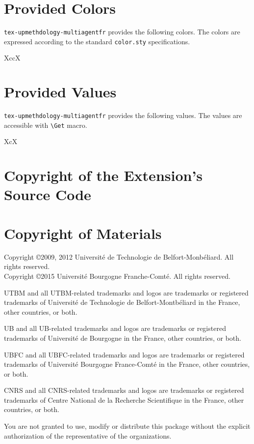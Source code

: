 \documentclass[article]{upmethodology-document}
\gdef\upmextensiondoccolorlist{}
\gdef\upmextensiondocvaluelist{}
\begin{document}
\section{Provided Colors}

\texttt{tex-upmethdology-multiagentfr} provides the following colors. The colors are expressed according to the standard \texttt{color.sty} specifications.

\begin{mtabular}{4}{XccX}
\upmextensiondoccolorlist
\end{mtabular}

\section{Provided Values}

\texttt{tex-upmethdology-multiagentfr} provides the following values. The values are accessible with \texttt{{\textbackslash}Get} macro.

\begin{tiny}
\begin{mtabular}{3}{XcX}
\upmextensiondocvaluelist
\end{mtabular}
\end{tiny}

\section{Copyright of the Extension's Source Code}



\section{Copyright of Materials}

Copyright \copyright 2009, 2012 Universit\'e de Technologie de Belfort-Monb\'eliard. All rights reserved. \\
Copyright \copyright 2015 Universit\'e Bourgogne Franche-Comt\'e. All rights reserved.

UTBM and all UTBM-related trademarks and logos are trademarks or registered trademarks of Universit\'e de Technologie de Belfort-Montb\'eliard in the France, other countries, or both.

UB and all UB-related trademarks and logos are trademarks or registered trademarks of Universit\'e de Bourgogne in the France, other countries, or both.

UBFC and all UBFC-related trademarks and logos are trademarks or registered trademarks of Universit\'e Bourgogne France-Comt\'e in the France, other countries, or both.

CNRS and all CNRS-related trademarks and logos are trademarks or registered trademarks of Centre National de la Recherche Scientifique in the France, other countries, or both.

You are not granted to use, modify or distribute this package without the explicit authorization of the representative of the organizations.
\end{document}
